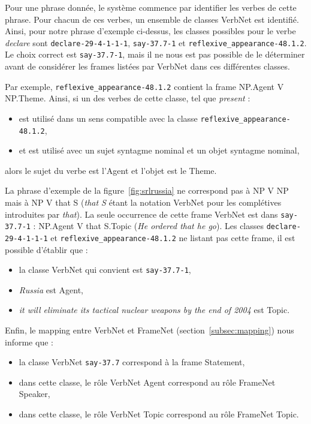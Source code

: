 Pour une phrase donnée, le système commence par identifier les verbes de cette
phrase. Pour chacun de ces verbes, un ensemble de classes VerbNet est
identifié. Ainsi, pour notre phrase d'exemple ci-dessus, les classes possibles
pour le verbe \emph{declare} sont \texttt{declare-29-4-1-1-1},
\texttt{say-37.7-1} et \texttt{reflexive\_appearance-48.1.2}. Le choix correct
est \texttt{say-37.7-1}, mais il ne nous est pas possible de le déterminer
avant de considérer les frames listées par VerbNet dans ces différentes
classes.

Par exemple, \texttt{reflexive\_appearance-48.1.2} contient la frame NP.Agent V
NP.Theme. Ainsi, si un des verbes de cette classe, tel que \emph{present} :
\begin{itemize}
    \item est utilisé dans un sens compatible avec la classe
        \texttt{reflexive\_appearance-48.1.2},
    \item et est utilisé avec un sujet syntagme nominal et un objet syntagme
        nominal,
\end{itemize}
alors le sujet du verbe est l'Agent et l'objet est le Theme.

La phrase d'exemple de la figure~\ref{fig:srlrussia} ne correspond pas à NP V
NP mais à NP V that S (\emph{that S} étant la notation VerbNet pour les
complétives introduites par \emph{that}). La seule occurrence de cette frame
VerbNet est dans \texttt{say-37.7-1} : NP.Agent V that S.Topic (\emph{He
ordered that he go}). Les classes \texttt{declare-29-4-1-1-1} et
\texttt{reflexive\_appearance-48.1.2} ne listant pas cette frame, il est
possible d'établir que :

\begin{itemize}
    \item la classe VerbNet qui convient est \texttt{say-37.7-1},
    \item \emph{Russia} est Agent,
    \item \emph{it will eliminate its tactical nuclear weapons by the end of 2004} est Topic.
\end{itemize}

Enfin, le mapping entre VerbNet et FrameNet (section~\ref{subsec:mapping}) nous
informe que :

\begin{itemize}
    \item la classe VerbNet \texttt{say-37.7} correspond à la frame Statement,
    \item dans cette classe, le rôle VerbNet Agent correspond au rôle FrameNet Speaker,
    \item dans cette classe, le rôle VerbNet Topic correspond au rôle FrameNet Topic.
\end{itemize}

